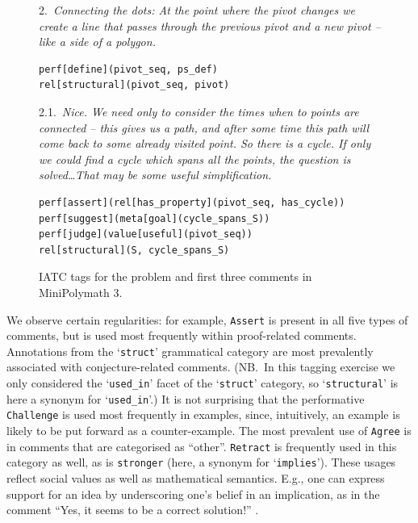 \documentclass[smallextended,oneside]{svjour3}       %
\let\cite\citep
\newcommand\nothing[1]{#1}
\let\paragraph\nothing
\begin{document}
{\begin{figure}
\begin{mdframed}
2.~\emph{Connecting the dots: At the point where the pivot changes we create a line that passes through the previous pivot and a new pivot -- like a side of a polygon.}

\begin{Verbatim}[commandchars=\\\{\}]
perf[define](pivot_seq, ps_def)
rel[structural](pivot_seq, pivot)
\end{Verbatim}

2.1.~\emph{Nice. We need only to consider the times when to points are connected -- this gives us a path, and after some time this path will come back to some already visited point. So there is a cycle. If only we could find a cycle which spans all the points, the question is solved\ldots That may be some useful simplification.}

\begin{Verbatim}[commandchars=\\\{\}]
perf[assert](rel[has_property](pivot_seq, has_cycle))
perf[suggest](meta[goal](cycle_spans_S))
perf[judge](value[useful](pivot_seq))
rel[structural](S, cycle_spans_S)
\end{Verbatim}
\end{mdframed}

\caption{IATC tags for the problem and first three comments in MiniPolymath 3. \label{fig:mpm3-example}}
\end{figure}


\paragraph{We observe certain regularities: for example, \texttt{Assert} is present in all five types of comments, but is used most frequently within proof-related comments.}
Annotations from the `\texttt{struct}' grammatical category are most prevalently associated with conjecture-related comments.
(NB.~In this tagging exercise we only considered the `\texttt{used\_in}' facet of the `\texttt{struct}' category, so `\texttt{structural}' is here a synonym for `\texttt{used\_in}'.)
It is not surprising that the performative \texttt{Challenge} is used
most frequently in examples, since, intuitively, an example is likely
to be put forward as a counter-example.  The most prevalent use of
\texttt{Agree} is in comments that are categorised as ``other''.
\texttt{Retract} is frequently used in this category as well, as is
\texttt{stronger} (here, a synonym for `\texttt{implies}').
These usages reflect social
values as well as mathematical semantics.  E.g., one can express support for
an idea by underscoring one's belief in an implication, as in the comment
``Yes, it seems to be a correct solution!'' \cite[\href{https://wp.me/pAG2F-41\#comment-3402}{July 19, 9:35 pm}]{tao2011imo}.

}
\end{document}
